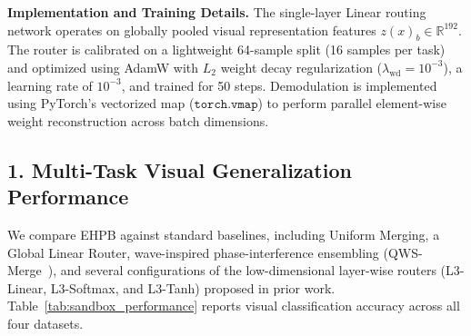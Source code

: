 \textbf{Implementation and Training Details.} The single-layer Linear routing network operates on globally pooled visual representation features $z(x)_b \in \mathbb{R}^{192}$. The router is calibrated on a lightweight 64-sample split (16 samples per task) and optimized using AdamW with $L_2$ weight decay regularization ($\lambda_{\text{wd}} = 10^{-3}$), a learning rate of $10^{-3}$, and trained for 50 steps. Demodulation is implemented using PyTorch's vectorized map ($\mathtt{torch.vmap}$) to perform parallel element-wise weight reconstruction across batch dimensions.

\subsection{1. Multi-Task Visual Generalization Performance}

We compare EHPB against standard baselines, including Uniform Merging, a Global Linear Router, wave-inspired phase-interference ensembling (QWS-Merge~\cite{chosetme2024qws}), and several configurations of the low-dimensional layer-wise routers (L3-Linear, L3-Softmax, and L3-Tanh) proposed in prior work. Table~\ref{tab:sandbox_performance} reports visual classification accuracy across all four datasets.

